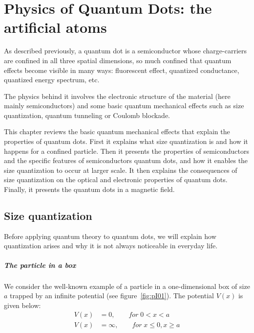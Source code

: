 \chapter{Physics of Quantum Dots: the artificial atoms} %
\label{physicsQD}

As described previously, a quantum dot is a semiconductor whose charge-carriers are confined in all three spatial dimensions, so much confined that quantum effects become visible in many ways: fluorescent effect, quantized conductance, quantized energy spectrum, etc.

The physics behind it involves the electronic structure of the material (here mainly semiconductors) and some basic quantum mechanical effects such as size quantization, quantum tunneling or Coulomb blockade.

This chapter reviews the basic quantum mechanical effects that explain the properties of quantum dots. First it explains what size quantization is and how it happens for a confined particle. Then it presents the properties of semiconductors and the specific features of semiconductors quantum dots, and how it enables the size quantization to occur at larger scale. It then explains the consequences of size quantization on the optical and electronic properties of quantum dots. Finally, it presents the quantum dots in a magnetic field.

\section{Size quantization}
\label{sec:sizeQuanta}
Before applying quantum theory to quantum dots, we will explain how quantization arises and why it is not always noticeable in everyday life.

\paragraph{The particle in a box}

We consider the well-known example of a particle in a one-dimensional box of size $a$ trapped by an infinite potential (see figure~\ref{fig:pI01}). 
The potential $V(x)$ is given below:
\begin{align}
V(x) &= 0, \qquad for \; 0<x<a \nonumber   \\ 
V(x) &= \infty, \qquad for \; x\leq 0,x\geq a
\label{eq:potInfinite}
\end{align}

